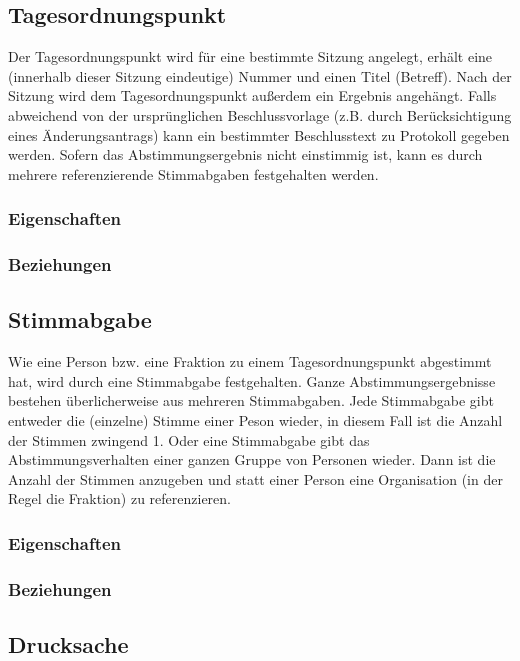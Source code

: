 \subsection{Tagesordnungspunkt}

Der Tagesordnungspunkt wird für eine bestimmte Sitzung angelegt, erhält
eine (innerhalb dieser Sitzung eindeutige) Nummer und einen Titel
(Betreff). Nach der Sitzung wird dem Tagesordnungspunkt außerdem ein
Ergebnis angehängt. Falls abweichend von der ursprünglichen
Beschlussvorlage (z.B. durch Berücksichtigung eines Änderungsantrags)
kann ein bestimmter Beschlusstext zu Protokoll gegeben werden. Sofern
das Abstimmungsergebnis nicht einstimmig ist, kann es durch mehrere
referenzierende Stimmabgaben festgehalten werden.

\subsubsection{Eigenschaften}

\subsubsection{Beziehungen}

\subsection{Stimmabgabe}

Wie eine Person bzw. eine Fraktion zu einem Tagesordnungspunkt
abgestimmt hat, wird durch eine Stimmabgabe festgehalten. Ganze
Abstimmungsergebnisse bestehen überlicherweise aus mehreren
Stimmabgaben. Jede Stimmabgabe gibt entweder die (einzelne) Stimme einer
Peson wieder, in diesem Fall ist die Anzahl der Stimmen zwingend 1. Oder
eine Stimmabgabe gibt das Abstimmungsverhalten einer ganzen Gruppe von
Personen wieder. Dann ist die Anzahl der Stimmen anzugeben und statt
einer Person eine Organisation (in der Regel die Fraktion) zu
referenzieren.

\subsubsection{Eigenschaften}

\subsubsection{Beziehungen}

\subsection{Drucksache}

